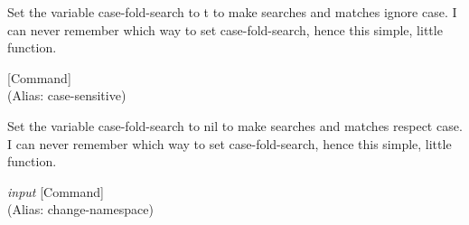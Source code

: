 \begin{doc-string}
Set the variable case-fold-search to t to make searches and matches ignore
case.  I can never remember which way to set case-fold-search, hence this
simple, little function.
\end{doc-string}

\vspace{1em}
\noindent
{}
\usebox{\funcname}
 \hfill [Command]\\%
 (Alias: case-sensitive)

\begin{doc-string}
Set the variable case-fold-search to nil to make searches and matches respect
case.  I can never remember which way to set case-fold-search, hence this
simple, little function.
\end{doc-string}

\vspace{1em}
\noindent
{}
\usebox{\funcname}\emph{input}
 \hfill [Command]\\%
 (Alias: change-namespace)

